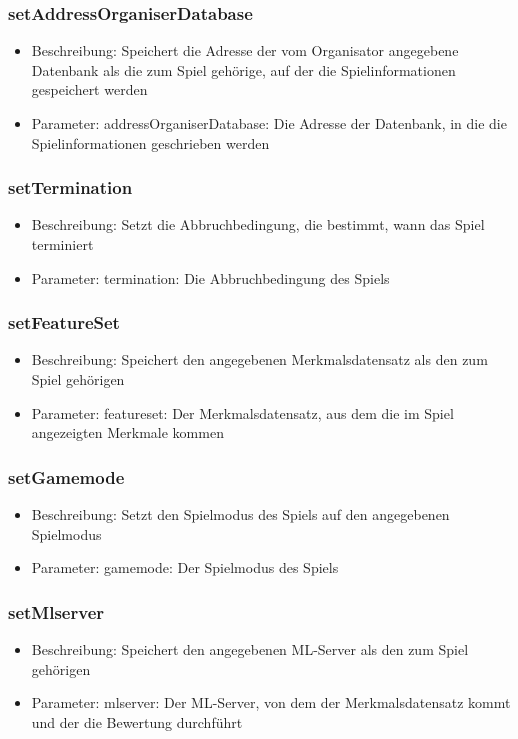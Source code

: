 \documentclass[a4paper]{scrreprt}
\begin{document}
	\subsubsection{setAddressOrganiserDatabase}
	\begin{itemize}
		\item Beschreibung: Speichert die Adresse der vom Organisator angegebene Datenbank als die zum Spiel gehörige, auf der die Spielinformationen gespeichert werden
		\item Parameter: addressOrganiserDatabase: Die Adresse der Datenbank, in die die Spielinformationen geschrieben werden
	\end{itemize}
	\subsubsection{setTermination}
	\begin{itemize}
		\item Beschreibung: Setzt die Abbruchbedingung, die bestimmt, wann das Spiel terminiert
		\item Parameter: termination: Die Abbruchbedingung des Spiels
	\end{itemize}
	\subsubsection{setFeatureSet}
	\begin{itemize}
		\item Beschreibung: Speichert den angegebenen Merkmalsdatensatz als den zum Spiel gehörigen
		\item Parameter: featureset: Der Merkmalsdatensatz, aus dem die im Spiel angezeigten Merkmale kommen
	\end{itemize}
	\subsubsection{setGamemode}
	\begin{itemize}
		\item Beschreibung: Setzt den Spielmodus des Spiels auf den angegebenen Spielmodus
		\item Parameter: gamemode: Der Spielmodus des Spiels
	\end{itemize}
	\subsubsection{setMlserver}
	\begin{itemize}
		\item Beschreibung: Speichert den angegebenen ML-Server als den zum Spiel gehörigen
		\item Parameter: mlserver: Der ML-Server, von dem der Merkmalsdatensatz kommt und der die Bewertung durchführt
	\end{itemize}
\end{document}
